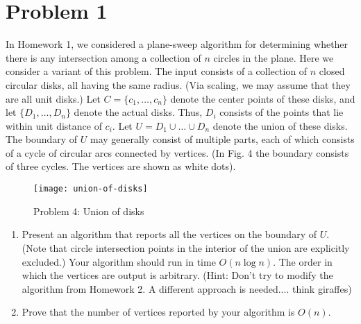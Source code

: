 \documentclass[11pt]{article}
\begin{document}

\newpage
\section*{Problem 1}

In Homework 1, we considered a plane-sweep algorithm for determining whether
there is any intersection among a collection of $n$ circles in the plane. Here
we consider a variant of this problem. The input consists of a collection of $n$
closed circular disks, all having the same radius. (Via scaling, we may assume
that they are all unit disks.) Let $C = \{c_1, \ldots , c_n\}$ denote the center
points of these disks, and let $\{D_1, \ldots, D_n\}$ denote the actual disks.
Thus, $D_i$ consists of the points that lie within unit distance of $c_i$. Let
$U = D_1 \cup \ldots \cup D_n$ denote the union of these disks. The boundary of
$U$ may generally consist of multiple parts, each of which consists of a cycle
of circular arcs connected by vertices. (In Fig. 4 the boundary consists of
three cycles. The vertices are shown as white dots).

\begin{figure}[h]
    \centering
    \texttt{[image: union-of-disks]}
    \caption{Problem 4: Union of disks}
\end{figure}


\begin{enumerate}

    \item Present an algorithm that reports all the vertices on the boundary of
        $U$. (Note that circle intersection points in the interior of the union
        are explicitly excluded.) Your algorithm should run in time $O(n \log
        n)$.  The order in which the vertices are output is arbitrary. (Hint:
        Don't try to modify the algorithm from Homework 2. A different approach
        is needed.... think giraffes)

    \item Prove that the number of vertices reported by your algorithm is
        $O(n)$.

\end{enumerate}
\end{document}

